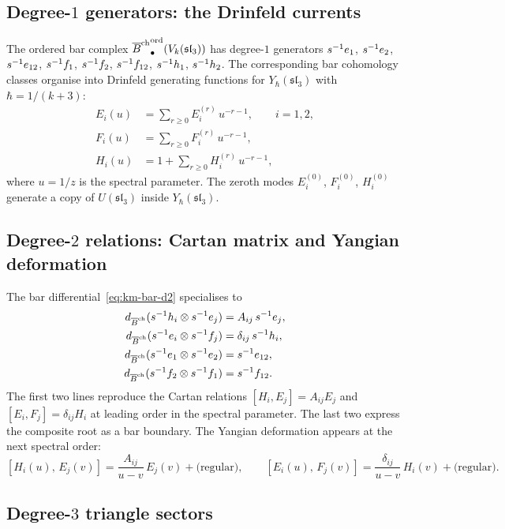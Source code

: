 \subsection{Degree-\texorpdfstring{$1$}{1} generators: the Drinfeld currents}

The ordered bar complex
${\overline{B}^{\mathrm{ch}}}^{\mathrm{ord}}_\bullet(V_k(\mathfrak{sl}_3))$
has degree-$1$ generators
$s^{-1}e_1$, $s^{-1}e_2$, $s^{-1}e_{12}$,
$s^{-1}f_1$, $s^{-1}f_2$, $s^{-1}f_{12}$,
$s^{-1}h_1$, $s^{-1}h_2$.
The corresponding bar cohomology classes organise into
Drinfeld generating functions for $Y_\hbar(\mathfrak{sl}_3)$
with $\hbar = 1/(k+3)$:
\begin{align*}
E_i(u) &= \sum_{r\ge 0} E_i^{(r)}\,u^{-r-1},
\qquad i=1,2,\\
F_i(u) &= \sum_{r\ge 0} F_i^{(r)}\,u^{-r-1},\\
H_i(u) &= 1+\sum_{r\ge 0} H_i^{(r)}\,u^{-r-1},
\end{align*}
where $u=1/z$ is the spectral parameter. The zeroth modes
$E_i^{(0)}$, $F_i^{(0)}$, $H_i^{(0)}$ generate a copy of
$U(\mathfrak{sl}_3)$ inside $Y_\hbar(\mathfrak{sl}_3)$.

\subsection{Degree-\texorpdfstring{$2$}{2} relations: Cartan matrix and Yangian deformation}

The bar differential~\eqref{eq:km-bar-d2} specialises to
\begin{align*}
d_{\overline{B}^{\mathrm{ch}}}(s^{-1}h_i\otimes s^{-1}e_j)
&=A_{ij}\,s^{-1}e_j,\\
d_{\overline{B}^{\mathrm{ch}}}(s^{-1}e_i\otimes s^{-1}f_j)
&=\delta_{ij}\,s^{-1}h_i,\\
d_{\overline{B}^{\mathrm{ch}}}(s^{-1}e_1\otimes s^{-1}e_2)
&=s^{-1}e_{12},\\
d_{\overline{B}^{\mathrm{ch}}}(s^{-1}f_2\otimes s^{-1}f_1)
&=s^{-1}f_{12}.
\end{align*}
The first two lines reproduce the Cartan relations
$[H_i,E_j]=A_{ij}E_j$ and $[E_i,F_j]=\delta_{ij}H_i$
at leading order in the spectral parameter. The last two express
the composite root as a bar boundary. The Yangian deformation
appears at the next spectral order:
\[
[H_i(u),\,E_j(v)]
=
\frac{A_{ij}}{u-v}\,E_j(v)+\text{(regular)},
\qquad
[E_i(u),\,F_j(v)]
=
\frac{\delta_{ij}}{u-v}\,H_i(v)+\text{(regular)}.
\]

\subsection{Degree-\texorpdfstring{$3$}{3} triangle sectors}

